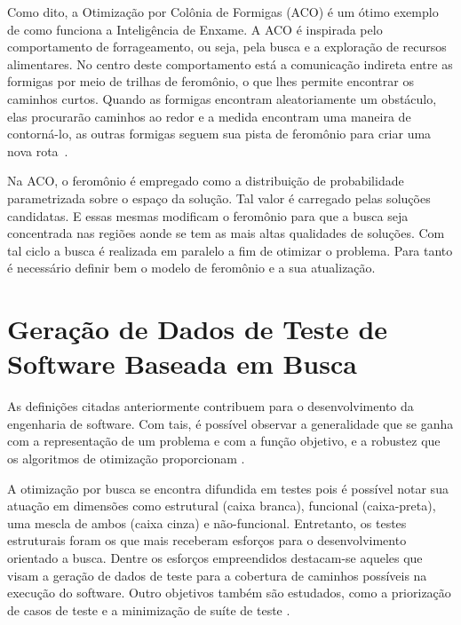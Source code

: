 Como dito, a Otimização por Colônia de Formigas (ACO) é um ótimo exemplo de como funciona a Inteligência de Enxame. A ACO é inspirada pelo comportamento de forrageamento, ou seja, pela busca e a exploração de recursos alimentares. No centro deste comportamento está a comunicação indireta entre as formigas por meio de
trilhas de feromônio, o que lhes permite encontrar os caminhos curtos. Quando as formigas encontram aleatoriamente um obstáculo, elas procurarão caminhos ao redor e a medida encontram uma maneira de contorná-lo, as outras formigas seguem sua pista de feromônio para criar uma nova rota~\cite{blum2008swarm}. 

Na ACO, o feromônio é empregado como a distribuição de probabilidade parametrizada sobre o espaço da solução. Tal valor é carregado pelas soluções candidatas. E essas mesmas modificam o feromônio para que a busca seja concentrada nas regiões aonde se tem as mais altas qualidades de soluções. Com tal ciclo a busca é realizada em paralelo a fim de otimizar o problema. Para tanto é necessário definir bem o modelo de feromônio e a sua atualização.

\section{Geração de Dados de Teste de Software Baseada em Busca \label{sec:trabsSBST}}

As definições citadas anteriormente contribuem para o desenvolvimento da engenharia de software. Com tais, é possível observar a generalidade que se ganha com a representação de um problema e com a função objetivo, e a robustez que os algoritmos de otimização proporcionam \cite{harman2012search}. 


A otimização por busca se encontra difundida em testes pois é possível notar sua atuação em dimensões como estrutural (caixa branca), funcional (caixa-preta), uma mescla de ambos (caixa cinza) e não-funcional.  Entretanto, os testes estruturais foram os que mais receberam esforços para o desenvolvimento orientado a busca. Dentre os esforços empreendidos destacam-se aqueles que visam a geração de dados de teste para a cobertura de caminhos possíveis na execução do software. Outro objetivos também são estudados, como a priorização de casos de teste e a minimização de suíte de teste \cite{khari2017extensive}. 

